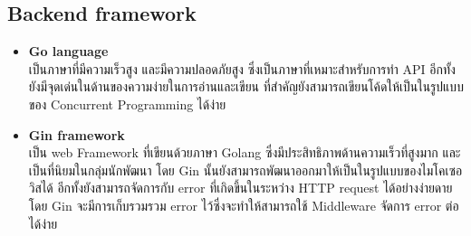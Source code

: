 \documentclass[12pt,oneside,openright,a4paper]{cpe-thai-project}
\begin{document}
\subsection{Backend framework}
\begin{itemize}
  \item \textbf{Go language} \\
  \hspace*{1cm} เป็นภาษาที่มีความเร็วสูง และมีความปลอดภัยสูง ซึ่งเป็นภาษาที่เหมาะสำหรับการทำ API อีกทั้งยังมีจุดเด่นในด้านของความง่ายในการอ่านและเขียน ที่สำคัญยังสามารถเขียนโค้ดให้เป็นในรูปแบบของ Concurrent Programming ได้ง่าย \cite{WhatIsGo, WhatIsConcurrentProgramming}
  \item \textbf{Gin framework} \\
\hspace*{1cm} เป็น web Framework ที่เขียนด้วยภาษา Golang ซึ่งมีประสิทธิภาพด้านความเร็วที่สูงมาก และเป็นที่นิยมในกลุ่มนักพัฒนา โดย Gin นั้นยังสามารถพัฒนาออกมาให้เป็นในรูปแบบของไมโคเซอวิสได้ อีกทั้งยังสามารถจัดการกับ error ที่เกิดขึ้นในระหว่าง HTTP request ได้อย่างง่ายดายโดย Gin  จะมีการเก็บรวมรวม error ไว้ซึ่งจะทำให้สามารถใช้ Middleware จัดการ error ต่อได้ง่าย \cite{WhatIsGin}
\end{itemize}
\end{document}
